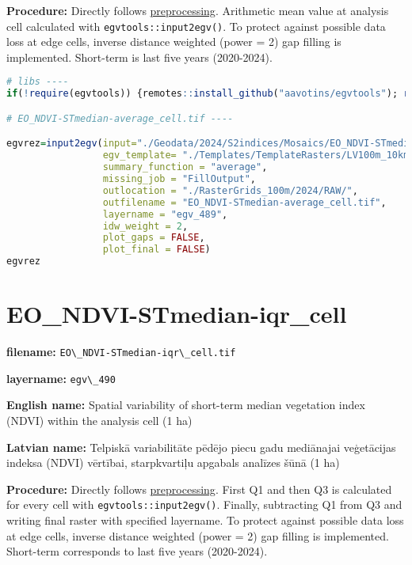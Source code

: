 \documentclass[
]{book}
\newcommand{\passthrough}[1]{#1}
\begin{document}
\textbf{Procedure:} Directly follows \hyperref[Ch04.13]{preprocessing}. Arithmetic mean value at analysis cell
calculated with \passthrough{\lstinline!egvtools::input2egv()!}. To protect against possible data loss at edge cells,
inverse distance weighted (power = 2) gap filling is implemented. Short-term is last five years (2020-2024).

\begin{lstlisting}[language=R]
# libs ----
if(!require(egvtools)) {remotes::install_github("aavotins/egvtools"); require(egvtools)}

# EO_NDVI-STmedian-average_cell.tif ----

egvrez=input2egv(input="./Geodata/2024/S2indices/Mosaics/EO_NDVI-STmedian.tif",
                 egv_template= "./Templates/TemplateRasters/LV100m_10km.tif",
                 summary_function = "average",
                 missing_job = "FillOutput",
                 outlocation = "./RasterGrids_100m/2024/RAW/",
                 outfilename = "EO_NDVI-STmedian-average_cell.tif",
                 layername = "egv_489",
                 idw_weight = 2,
                 plot_gaps = FALSE,
                 plot_final = FALSE)
egvrez
\end{lstlisting}

\section{EO\_NDVI-STmedian-iqr\_cell}\label{ch06.490}

\textbf{filename:} \passthrough{\lstinline!EO\_NDVI-STmedian-iqr\_cell.tif!}

\textbf{layername:} \passthrough{\lstinline!egv\_490!}

\textbf{English name:} Spatial variability of short-term median vegetation index (NDVI) within the analysis cell (1 ha)

\textbf{Latvian name:} Telpiskā variabilitāte pēdējo piecu gadu mediānajai veģetācijas indeksa (NDVI) vērtībai, starpkvartiļu apgabals analīzes šūnā (1 ha)

\textbf{Procedure:} Directly follows \hyperref[Ch04.13]{preprocessing}. First Q1 and then Q3
is calculated for every cell with \passthrough{\lstinline!egvtools::input2egv()!}. Finally, subtracting
Q1 from Q3 and writing final raster with specified layername. To protect against possible data loss at edge cells,
inverse distance weighted (power = 2) gap filling is implemented. Short-term corresponds
to last five years (2020-2024).
\end{document}
